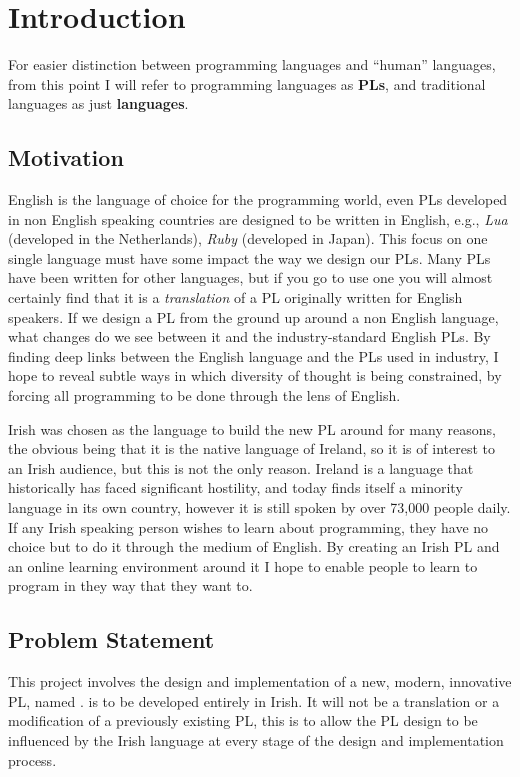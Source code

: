 \chapter{Introduction}
For easier distinction between programming languages and ``human'' languages, from this point I will refer to programming languages as \textbf{PLs}, and traditional languages as just \textbf{languages}.

\section{Motivation}
English is the language of choice for the programming world, even PLs developed in non English speaking countries are designed to be written in English, e.g., \emph{Lua} (developed in the Netherlands), \emph{Ruby} (developed in Japan). This focus on one single language must have some impact the way we design our PLs. Many PLs have been written for other languages, but if you go to use one you will almost certainly find that it is a \emph{translation} of a PL originally written for English speakers\cite{wikipllist}. If we design a PL from the ground up around a non English language, what changes do we see between it and the industry-standard English PLs. By finding deep links between the English language and the PLs used in industry, I hope to reveal subtle ways in which diversity of thought is being constrained, by forcing all programming to be done through the lens of English.

Irish was chosen as the language to build the new PL around for many reasons, the obvious being that it is the native language of Ireland, so it is of interest to an Irish audience, but this is not the only reason. Ireland is a language that historically has faced significant hostility, and today finds itself a minority language in its own country, however it is still spoken by over 73,000 people daily\cite{csoirish}. If any Irish speaking person wishes to learn about programming, they have no choice but to do it through the medium of English. By creating an Irish PL and an online learning environment around it I hope to enable people to learn to program in they way that they want to.

\section{Problem Statement}
This project involves the design and implementation of a new, modern, innovative PL, named \Setanta{}. \Setanta{} is to be developed entirely in Irish. It will not be a translation or a modification of a previously existing PL, this is to allow the PL design to be influenced by the Irish language at every stage of the design and implementation process.

